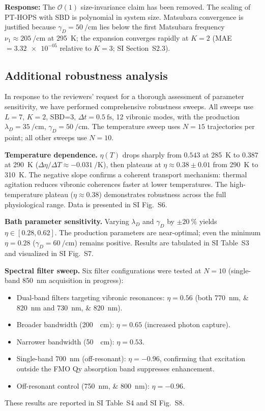 \documentclass[11pt]{article}
\begin{document}
\textbf{Response:} The $\mathcal{O}(1)$ size-invariance claim has been removed. The scaling of PT-HOPS with SBD is polynomial in system size. Matsubara convergence is justified because $\gamma_D = \SI{50}{\per\centi\meter}$ lies below the first Matsubara frequency $\nu_1 \approx \SI{205}{\per\centi\meter}$ at \SI{295}{\kelvin}; the expansion converges rapidly at $K=2$ (MAE $= \num{3.32e-05}$ relative to $K=3$; SI Section~S2.3).

\subsection*{Additional robustness analysis}

In response to the reviewers' request for a thorough assessment of parameter sensitivity, we have performed comprehensive robustness sweeps. All sweeps use $L=7$, $K=2$, SBD=3, $\Delta t = \SI{0.5}{\femto\second}$, 12 vibronic modes, with the production $\lambda_D = \SI{35}{\per\centi\meter}$, $\gamma_D = \SI{50}{\per\centi\meter}$. The temperature sweep uses $N=15$ trajectories per point; all other sweeps use $N=10$.

\textbf{Temperature dependence.} $\eta(T)$ drops sharply from $\num{0.543}$ at \SI{285}{\kelvin} to $\num{0.387}$ at \SI{290}{\kelvin} ($\Delta\eta/\Delta T \approx \SI{-0.031}{\per\kelvin}$), then plateaus at $\eta \approx \num{0.38}\pm\num{0.01}$ from \SI{290}{\kelvin} to \SI{310}{\kelvin}. The negative slope confirms a coherent transport mechanism: thermal agitation reduces vibronic coherences faster at lower temperatures. The high-temperature plateau ($\eta \approx \num{0.38}$) demonstrates robustness across the full physiological range. Data is presented in SI Fig.~S6.

\textbf{Bath parameter sensitivity.} Varying $\lambda_D$ and $\gamma_D$ by $\pm\SI{20}{\percent}$ yields $\eta \in [\num{0.28}, \num{0.62}]$. The production parameters are near-optimal; even the minimum $\eta = \num{0.28}$ ($\gamma_D = \SI{60}{\per\centi\meter}$) remains positive. Results are tabulated in SI Table~S3 and visualized in SI Fig.~S7.

\textbf{Spectral filter sweep.} Six filter configurations were tested at $N=10$ (single-band 850~nm acquisition in progress):
\begin{itemize}
    \item Dual-band filters targeting vibronic resonances: $\eta = \num{0.56}$ (both \SIlist{770;820}{\nano\meter} and \SIlist{730;820}{\nano\meter}).
    \item Broader bandwidth (\SI{200}{\per\centi\meter}): $\eta = \num{0.65}$ (increased photon capture).
    \item Narrower bandwidth (\SI{50}{\per\centi\meter}): $\eta = \num{0.53}$.
    \item Single-band 700~nm (off-resonant): $\eta = \num{-0.96}$, confirming that excitation outside the FMO Qy absorption band suppresses enhancement.
    \item Off-resonant control (\SIlist{750;800}{\nano\meter}): $\eta = \num{-0.96}$.
\end{itemize}
These results are reported in SI Table~S4 and SI Fig.~S8.
\end{document}
